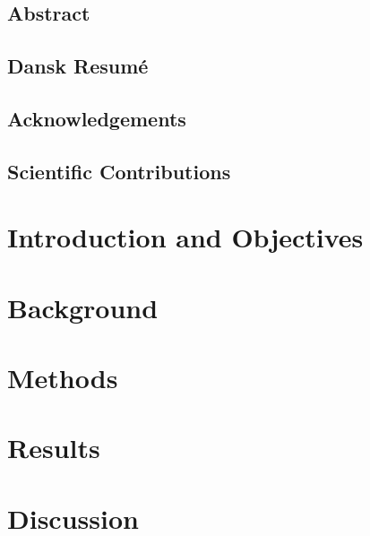 \documentclass[11pt, a4paper, openany]{memoir}
\subtitle{How new data representations from phylogenetics, protein structure, and animal tracking can support outbreak intelligence}
\begin{document}
\begingroup
  \selectfont
  \maketitle
\endgroup

\section*{Abstract}

\clearpage
\section*{Dansk Resumé}

\clearpage
\section*{Acknowledgements}

\clearpage
\section*{Scientific Contributions}

\clearpage
{}
\printnoidxglossary[title=Abbreviations]
\clearpage

\tableofcontents

\chapter{Introduction and Objectives}


\chapter{Background}


\chapter{Methods}


\chapter{Results}


\chapter{Discussion}


\end{document}
